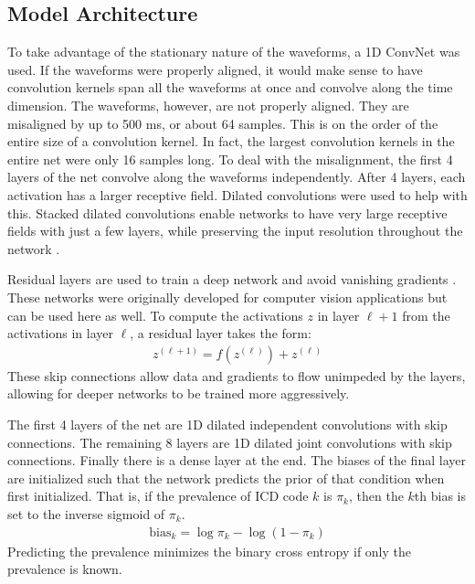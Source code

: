 \subsection{Model Architecture}

To take advantage of the stationary nature of the waveforms, a 1D ConvNet was used.  If the waveforms were properly aligned, it would make sense to have convolution kernels span all the waveforms at once and convolve along the time dimension.  The waveforms, however, are not properly aligned.  They are misaligned by up to 500 ms, or about 64 samples.  This is on the order of the entire size of a convolution kernel.  In fact, the largest convolution kernels in the entire net were only 16 samples long.  To deal with the misalignment, the first 4 layers of the net convolve along the waveforms independently.  After 4 layers, each activation has a larger receptive field.  Dilated convolutions were used to help with this.  Stacked dilated convolutions enable networks to have very large receptive fields with just a few layers, while preserving the input resolution throughout the network \cite{oord2016wavenet}.  

Residual layers are used to train a deep network and avoid vanishing gradients \cite{he2016deep}.  These networks were originally developed for computer vision applications but can be used here as well.  To compute the activations $z$ in layer $\ell + 1$ from the activations in layer $\ell$, a residual layer takes the form:
\begin{gather}
    z^{(\ell + 1)} = f(z^{(\ell)}) + z^{(\ell)}
\end{gather}
These skip connections allow data and gradients to flow unimpeded by the layers, allowing for deeper networks to be trained more aggressively.

The first 4 layers of the net are 1D dilated independent convolutions with skip connections.  The remaining 8 layers are 1D dilated joint convolutions with skip connections.  Finally there is a dense layer at the end.  The biases of the final layer are initialized such that the network predicts the prior of that condition when first initialized.  That is, if the prevalence of ICD code $k$ is $\pi_k$, then the $k$th bias is set to the inverse sigmoid of $\pi_k$.
\begin{gather}
    \text{bias}_k = \log \pi_k - \log(1 - \pi_k)
\end{gather}
Predicting the prevalence minimizes the binary cross entropy if only the prevalence is known.

